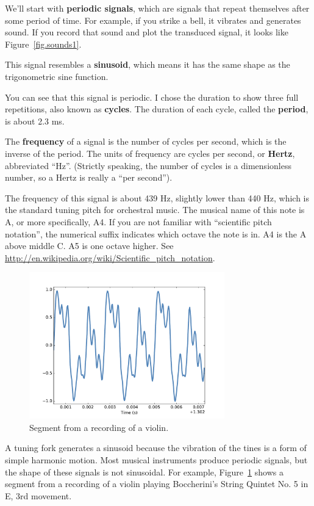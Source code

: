 \documentclass[12pt]{book}
\begin{document}
We'll start with {\bf periodic signals}, which are signals that
repeat themselves after some period of time.  For example, if you
strike a bell, it vibrates and generates sound.  If you record
that sound and plot the transduced signal, it looks like
Figure~\ref{fig.sounds1}.

This signal resembles a {\bf sinusoid}, which means it has the same
shape as the trigonometric sine function.

You can see that this signal is periodic.  I chose the duration
to show three full repetitions, also known as {\bf cycles}.
The duration of each cycle, called the {\bf period}, is about 2.3 ms.

The {\bf frequency} of a signal is the number of cycles
per second, which is the inverse of the period.
The units of frequency are cycles per second, or {\bf Hertz},
abbreviated ``Hz''.  (Strictly speaking, the number of cycles is
a dimensionless number, so a Hertz is really a ``per second'').

The frequency of this signal is about 439 Hz, slightly lower than 440
Hz, which is the standard tuning pitch for orchestral music.  The
musical name of this note is A, or more specifically, A4.  If you are
not familiar with ``scientific pitch notation'', the numerical suffix
indicates which octave the note is in.  A4 is the A above middle C.
A5 is one octave higher.  See
\url{http://en.wikipedia.org/wiki/Scientific_pitch_notation}.

\begin{figure}
\centerline{\includegraphics[height=2.5in]{figs/sounds2.pdf}}
\caption{Segment from a recording of a violin.}
\label{fig.sounds2}
\end{figure}

A tuning fork generates a sinusoid because the vibration of the tines
is a form of simple harmonic motion.  Most musical instruments
produce periodic signals, but the shape of these signals is not
sinusoidal.  For example, Figure~\ref{fig.sounds2} shows a segment
from a recording of a violin playing
Boccherini's String Quintet No. 5 in E, 3rd
movement.
\end{document}
